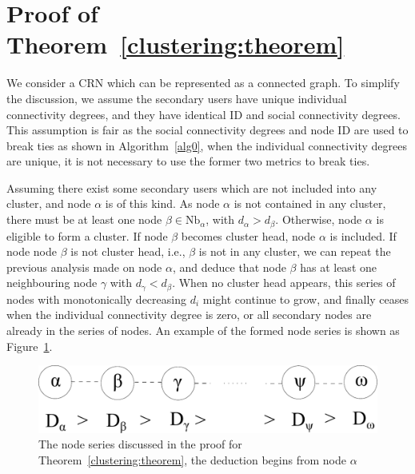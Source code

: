\documentclass[10pt,journal,compsoc]{IEEEtran}
\makeatletter
\theoremstyle{mytheoremstyle}
\theoremstyle{mytheoremstyle}
\theoremstyle{mytheoremstyle}
\renewenvironment{proof}[1][\proofname]{%
      \par\pushQED{\qed}\fontfamily{ptm}\selectfont%
      \topsep6\p@\@plus6\p@\relax
      \trivlist\item[\hskip\labelsep\bfseries#1\@addpunct{.}]%
      \ignorespaces
    }{%
      \popQED\endtrivlist\@endpefalse
    }
\newcommand{\ie}{i.e., }
\makeatother
\begin{document}
\section*{Proof of Theorem~\ref{clustering:theorem}}
\label{proof_clustering:theorem}
\begin{proof}
We consider a CRN which can be represented as a connected graph.
To simplify the discussion, we assume the secondary users have unique individual connectivity degrees, and they have identical ID and social connectivity degrees.
This assumption is fair as the social connectivity degrees and node ID are used to break ties as shown in Algorithm~\ref{alg0}, when the individual connectivity degrees are unique, it is not necessary to use the former two metrics to break ties.

Assuming there exist some secondary users which are not included into any cluster, and node $\alpha$ is of this kind.
As node $\alpha$ is not contained in any cluster, there must be at least one node $\beta\in \text{Nb}_\alpha$, with $d_{\alpha} > d_{\beta}$.
Otherwise, node $\alpha$ is eligible to form a cluster.
If node $\beta$ becomes cluster head, node $\alpha$ is included.
If node node $\beta$ is not cluster head, i.e., $\beta$ is not in any cluster, we can repeat the previous analysis made on node $\alpha$, and deduce that node $\beta$ has at least one neighbouring node $\gamma$ with $d_{\gamma} < d_{\beta}$.
When no cluster head appears, this series of nodes with monotonically decreasing $d_i$ might continue to grow, and finally ceases when the individual connectivity degree is zero, or all secondary nodes are already in the series of nodes.
An example of the formed node series is shown as Figure~\ref{lemma1}.

\begin{figure}[ht!]
  \centering
\includegraphics[width=0.6\linewidth]{lemma1.pdf}
	\caption{The node series discussed in the proof for Theorem~\ref{clustering:theorem}, the deduction begins from node $\alpha$}
	\label{lemma1}
\end{figure}



\end{proof}
\end{document}
